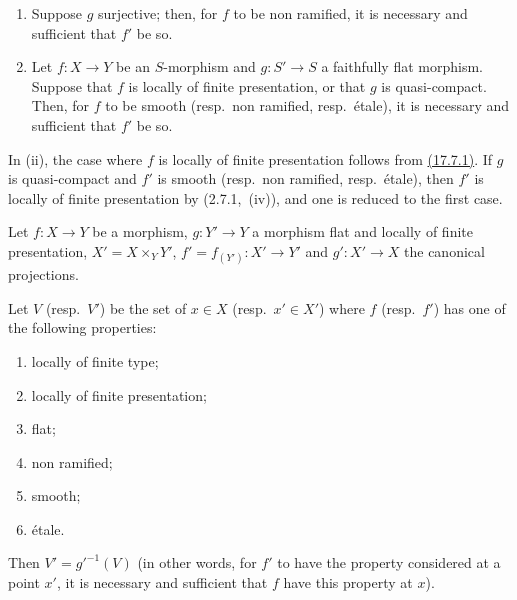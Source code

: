 \begin{corollary}[17.7.3]
\label{IV.17.7.3}
\begin{enumerate}[label=(\roman*)]
  \item Suppose $g$ surjective; then, for $f$ to be non ramified, it is necessary and sufficient that $f'$ be so.
  \item Let $f:X\to Y$ be an $S$-morphism and $g:S'\to S$ a faithfully flat morphism.
  Suppose that $f$ is locally of finite presentation, or that $g$ is quasi-compact.
  Then, for $f$ to be smooth (resp.\ non ramified, resp.\ \'etale), it is necessary and sufficient that $f'$ be so.
\end{enumerate}
\end{corollary}

In (ii), the case where $f$ is locally of finite presentation follows from {\hyperlink{ega4.c04.prop.17-7-1}{(17.7.1)}}.
If $g$ is quasi-compact and $f'$ is smooth (resp.\ non ramified, resp.\ \'etale), then $f'$ is locally of finite presentation by (2.7.1,~(iv)), and one is reduced to the first case.

\begin{proposition}[17.7.4]
\label{IV.17.7.4}
Let $f:X\to Y$ be a morphism, $g:Y'\to Y$ a morphism flat and locally of finite presentation, $X'=X\times_Y Y'$, $f'=f_{(Y')}:X'\to Y'$ and $g':X'\to X$ the canonical projections.


Let $V$ (resp.\ $V'$) be the set of $x\in X$ (resp.\ $x'\in X'$) where $f$ (resp.\ $f'$) has one of the following properties:
\begin{enumerate}[label=(\roman*)]
  \item locally of finite type;
  \item locally of finite presentation;
  \item flat;
  \item non ramified;
  \item smooth;
  \item \'etale.
\end{enumerate}
Then $V'=g'^{-1}(V)$ (in other words, for $f'$ to have the property considered at a point $x'$, it is necessary and sufficient that $f$ have this property at $x$).
\end{proposition}

